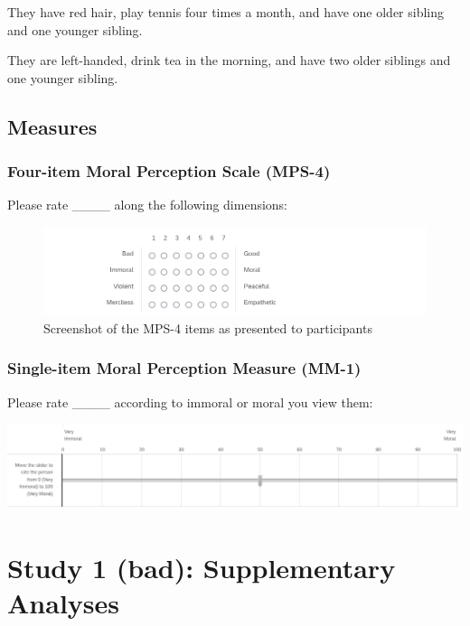 \documentclass[
  man,floatsintext]{apa6}
\begin{document}
They have red hair, play tennis four times a month, and have one older sibling and one younger sibling.

They are left-handed, drink tea in the morning, and have two older siblings and one younger sibling.

\newpage

\subsection{Measures}\label{measures}

\subsubsection{Four-item Moral Perception Scale (MPS-4)}\label{four-item-moral-perception-scale-mps-4}

Please rate \_\_\_\_ along the following dimensions:

\begin{figure}
\centering
\includegraphics{../resources/images/mps4.png}
\caption{Screenshot of the MPS-4 items as presented to participants}
\end{figure}

\subsubsection{Single-item Moral Perception Measure (MM-1)}\label{single-item-moral-perception-measure-mm-1}

Please rate \_\_\_\_ according to immoral or moral you view them:

\includegraphics{../resources/images/mm1.png}
\newpage

\pagebreak

\section{Study 1 (bad): Supplementary Analyses}\label{study-1-bad-supplementary-analyses}
\end{document}
